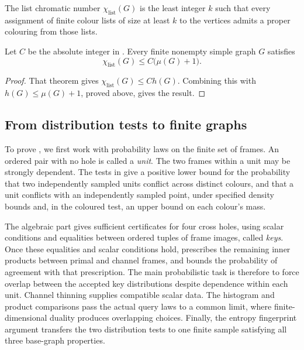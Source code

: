 The list chromatic number \(\chi_{\mathrm{list}}(G)\) is the least
integer \(k\) such that every assignment of finite colour lists of
size at least \(k\) to the vertices admits a proper colouring from
those lists.

\begin{corollary}\label{cor:list-spectral}
Let \(C\) be the absolute integer in
\citet[Theorem~1.1]{OpenAILinearListHadwiger2026}. Every finite nonempty
simple graph \(G\) satisfies
\[
 \chi_{\mathrm{list}}(G)\le C\bigl(\mu(G)+1\bigr).
\]
\end{corollary}
\begin{proof}
That theorem gives \(\chi_{\mathrm{list}}(G)\le Ch(G)\). Combining this
with \(h(G)\le\mu(G)+1\), proved above, gives the result.
\end{proof}

\subsection{From distribution tests to finite graphs}

To prove , we first work with probability laws
on the finite set of frames. An ordered pair with no hole is called
a \emph{unit}. The two frames within a unit may be strongly dependent.
The tests in  give a positive lower bound
for the probability that two independently sampled units conflict
across distinct colours, and that a unit conflicts with an independently
sampled point, under specified density bounds and, in the coloured
test, an upper bound on each colour's mass.

The algebraic part gives sufficient certificates for four cross holes,
using scalar conditions and equalities between ordered tuples of frame images, called
\emph{keys}. Once these equalities and scalar conditions hold,
 prescribes the remaining inner products
between primal and channel frames, and  bounds
the probability of agreement with that prescription. The main
probabilistic task is therefore to force overlap between the accepted
key distributions despite dependence within each unit. Channel thinning
supplies compatible scalar data. The histogram and product comparisons
pass the actual query laws to a common limit, where finite-dimensional
duality produces overlapping choices. Finally, the entropy fingerprint
argument transfers the two distribution tests to one finite sample
satisfying all three base-graph properties.

